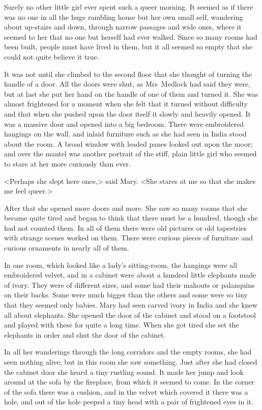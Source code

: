 Surely no other little girl ever spent such a queer morning. It seemed as if there was no one in all the huge rambling house but her own small self, wandering about up-stairs and down, through narrow passages and wide ones, where it seemed to her that no one but herself had ever walked. Since so many rooms had been built, people must have lived in them, but it all seemed so empty that she could not quite believe it true.

It was not until she climbed to the second floor that she thought of turning the handle of a door. All the doors were shut, as Mrs~Medlock had said they were, but at last she put her hand on the handle of one of them and turned it. She was almost frightened for a moment when she felt that it turned without difficulty and that when she pushed upon the door itself it slowly and heavily opened. It was a massive door and opened into a big bedroom. There were embroidered hangings on the wall, and inlaid furniture such as she had seen in India stood about the room. A broad window with leaded panes looked out upon the moor; and over the mantel was another portrait of the stiff, plain little girl who seemed to stare at her more curiously than ever.

<Perhaps she slept here once,> said Mary. <She stares at me so that she makes me feel queer.>

After that she opened more doors and more. She saw so many rooms that she became quite tired and began to think that there must be a hundred, though she had not counted them. In all of them there were old pictures or old tapestries with strange scenes worked on them. There were curious pieces of furniture and curious ornaments in nearly all of them.

In one room, which looked like a lady's sitting-room, the hangings were all embroidered velvet, and in a cabinet were about a hundred little elephants made of ivory. They were of different sizes, and some had their mahouts or palanquins on their backs. Some were much bigger than the others and some were so tiny that they seemed only babies. Mary had seen carved ivory in India and she knew all about elephants. She opened the door of the cabinet and stood on a footstool and played with these for quite a long time. When she got tired she set the elephants in order and shut the door of the cabinet.

In all her wanderings through the long corridors and the empty rooms, she had seen nothing alive; but in this room she saw something. Just after she had closed the cabinet door she heard a tiny rustling sound. It made her jump and look around at the sofa by the fireplace, from which it seemed to come. In the corner of the sofa there was a cushion, and in the velvet which covered it there was a hole, and out of the hole peeped a tiny head with a pair of frightened eyes in it.


